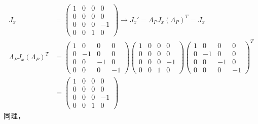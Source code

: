 \begin{align}
\label{equ3.149}
	J_x &=
		\begin{pmatrix}
			1 & 0 & 0 & 0 \\
			0 & 0 & 0 & 0 \\
			0 & 0 & 0 & -1 \\
			0 & 0 & 1 & 0
		\end{pmatrix}
	\rightarrow
	J_x' = \Lambda_P J_x (\Lambda_P)^T = J_x
	\\
	\Lambda_P J_x (\Lambda_P)^T &=
		\begin{pmatrix}
			1 & 0 & 0 & 0 \\
			0 & -1 & 0 & 0 \\
			0 & 0 & -1 & 0 \\
			0 & 0 & 0 & -1
		\end{pmatrix}
		\begin{pmatrix}
			1 & 0 & 0 & 0 \\
			0 & 0 & 0 & 0 \\
			0 & 0 & 0 & -1 \\
			0 & 0 & 1 & 0
		\end{pmatrix}
		{
		\begin{pmatrix}
			1 & 0 & 0 & 0 \\
			0 & -1 & 0 & 0 \\
			0 & 0 & -1 & 0 \\
			0 & 0 & 0 & -1
		\end{pmatrix}
		}^T
	\nonumber \\
\label{equ3.150}
	&=
		\begin{pmatrix}
			1 & 0 & 0 & 0 \\
			0 & 0 & 0 & 0 \\
			0 & 0 & 0 & -1 \\
			0 & 0 & 1 & 0
		\end{pmatrix}
\end{align}
同理，
